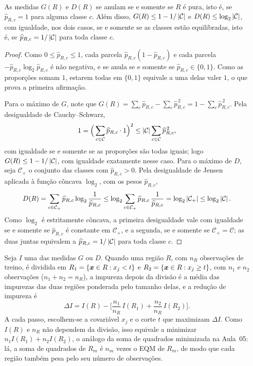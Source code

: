 \documentclass[11pt,a4paper]{article}
\begin{document}
\begin{proposicao}\label{prop:impureza}
As medidas $G(R)$ e $D(R)$ se anulam se e somente se $R$ é pura, isto é, se
$\widehat p_{R,c}=1$ para alguma classe $c$. Além disso,
$G(R)\le 1-1/\left\lvert \mathcal{C} \right\rvert$ e $D(R)\le\log_2\left\lvert \mathcal{C} \right\rvert$, com igualdade, nos
dois casos, se e somente se as classes estão equilibradas, isto é, se
$\widehat p_{R,c}=1/\left\lvert \mathcal{C} \right\rvert$ para toda classe $c$.
\end{proposicao}
\begin{proof}
Como $0\le\widehat p_{R,c}\le1$, cada parcela $\widehat p_{R,c}(1-\widehat p_{R,c})$ e
cada parcela $-\widehat p_{R,c}\log_2\widehat p_{R,c}$ é não negativa, e se anula se e
somente se $\widehat p_{R,c}\in\{0,1\}$. Como as proporções somam $1$, estarem todas em
$\{0,1\}$ equivale a uma delas valer $1$, o que prova a primeira afirmação.

Para o máximo de $G$, note que
$G(R)=\sum_c\widehat p_{R,c}-\sum_c\widehat p_{R,c}^{\,2}=1-\sum_c\widehat p_{R,c}^{\,2}$.
Pela desigualdade de Cauchy--Schwarz,
\[
  1=\Big(\sum_{c\in\mathcal{C}}\widehat p_{R,c}\cdot 1\Big)^2
  \le\left\lvert \mathcal{C} \right\rvert\sum_{c\in\mathcal{C}}\widehat p_{R,c}^{\,2},
\]
com igualdade se e somente se as proporções são todas iguais; logo
$G(R)\le1-1/\left\lvert \mathcal{C} \right\rvert$, com igualdade exatamente nesse caso. Para o máximo de
$D$, seja $\mathcal{C}_+$ o conjunto das classes com $\widehat p_{R,c}>0$. Pela
desigualdade de Jensen aplicada à função côncava $\log_2$, com os pesos
$\widehat p_{R,c}$,
\[
  D(R)=\sum_{c\in\mathcal{C}_+}\widehat p_{R,c}\log_2\frac{1}{\widehat p_{R,c}}
  \le\log_2\sum_{c\in\mathcal{C}_+}\widehat p_{R,c}\,\frac{1}{\widehat p_{R,c}}
  =\log_2\left\lvert \mathcal{C}_+ \right\rvert\le\log_2\left\lvert \mathcal{C} \right\rvert .
\]
Como $\log_2$ é estritamente côncava, a primeira desigualdade vale com igualdade se e
somente se $\widehat p_{R,c}$ é constante em $\mathcal{C}_+$, e a segunda, se e
somente se $\mathcal{C}_+=\mathcal{C}$; as duas juntas equivalem a
$\widehat p_{R,c}=1/\left\lvert \mathcal{C} \right\rvert$ para toda classe $c$.
\end{proof}

Seja $I$ uma das medidas $G$ ou $D$. Quando uma região $R$, com $n_R$ observações de
treino, é dividida em $R_1=\{\bm{x}\in R: x_j<t\}$ e $R_2=\{\bm{x}\in R: x_j\ge t\}$, com
$n_1$ e $n_2$ observações ($n_1+n_2=n_R$), a impureza depois da divisão é a média das
impurezas das duas regiões ponderada pelo tamanho delas, e a redução de impureza é
\[
  \Delta I = I(R)-\Big[\frac{n_1}{n_R}\,I(R_1)+\frac{n_2}{n_R}\,I(R_2)\Big].
\]
A cada passo, escolhem-se a covariável $x_j$ e o corte $t$ que maximizam $\Delta I$.
Como $I(R)$ e $n_R$ não dependem da divisão, isso equivale a minimizar
$n_1I(R_1)+n_2I(R_2)$, o análogo da soma de quadrados minimizada na Aula~05: lá, a soma
de quadrados de $R_m$ é $n_m$ vezes o EQM de $R_m$, de modo que cada região também pesa
pelo seu número de observações.
\end{document}
